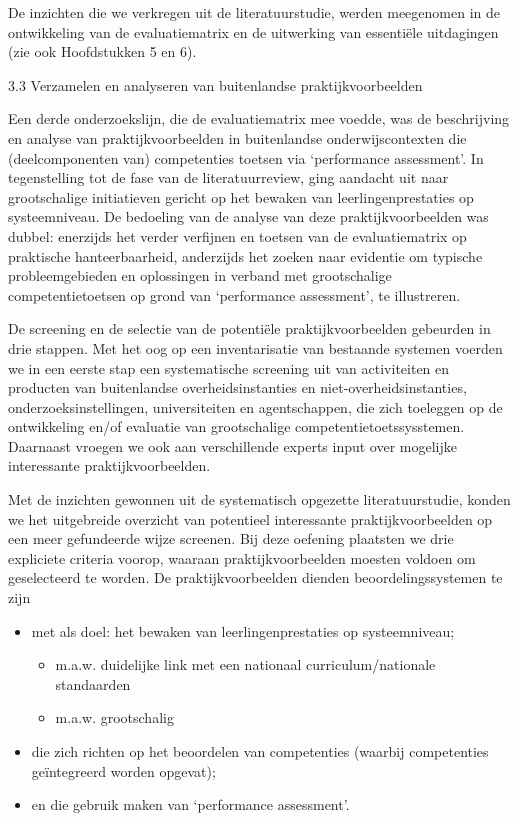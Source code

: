 \documentclass[
  letterpaper,
]{report}
\providecommand{\tightlist}{%
  \setlength{\itemsep}{0pt}\setlength{\parskip}{0pt}}
\begin{document}
De inzichten die we verkregen uit de literatuurstudie, werden meegenomen
in de ontwikkeling van de evaluatiematrix en de uitwerking van
essentiële uitdagingen (zie ook Hoofdstukken 5 en 6).

3.3 Verzamelen en analyseren van buitenlandse praktijkvoorbeelden

Een derde onderzoekslijn, die de evaluatiematrix mee voedde, was de
beschrijving en analyse van praktijkvoorbeelden in buitenlandse
onderwijscontexten die (deelcomponenten van) competenties toetsen via
`performance assessment'. In tegenstelling tot de fase van de
literatuurreview, ging aandacht uit naar grootschalige initiatieven
gericht op het bewaken van leerlingenprestaties op systeemniveau. De
bedoeling van de analyse van deze praktijkvoorbeelden was dubbel:
enerzijds het verder verfijnen en toetsen van de evaluatiematrix op
praktische hanteerbaarheid, anderzijds het zoeken naar evidentie om
typische probleemgebieden en oplossingen in verband met grootschalige
competentietoetsen op grond van `performance assessment', te
illustreren.

De screening en de selectie van de potentiële praktijkvoorbeelden
gebeurden in drie stappen. Met het oog op een inventarisatie van
bestaande systemen voerden we in een eerste stap een systematische
screening uit van activiteiten en producten van buitenlandse
overheidsinstanties en niet-overheidsinstanties, onderzoeksinstellingen,
universiteiten en agentschappen, die zich toeleggen op de ontwikkeling
en/of evaluatie van grootschalige competentietoetssysstemen. Daarnaast
vroegen we ook aan verschillende experts input over mogelijke
interessante praktijkvoorbeelden.

Met de inzichten gewonnen uit de systematisch opgezette
literatuurstudie, konden we het uitgebreide overzicht van potentieel
interessante praktijkvoorbeelden op een meer gefundeerde wijze screenen.
Bij deze oefening plaatsten we drie expliciete criteria voorop, waaraan
praktijkvoorbeelden moesten voldoen om geselecteerd te worden. De
praktijkvoorbeelden dienden beoordelingssystemen te zijn

\begin{itemize}
\tightlist
\item
  met als doel: het bewaken van leerlingenprestaties op systeemniveau;

  \begin{itemize}
  \tightlist
  \item
    m.a.w. duidelijke link met een nationaal curriculum/nationale
    standaarden
  \item
    m.a.w. grootschalig
  \end{itemize}
\item
  die zich richten op het beoordelen van competenties (waarbij
  competenties geïntegreerd worden opgevat);
\item
  en die gebruik maken van `performance assessment'.
\end{itemize}
\end{document}
